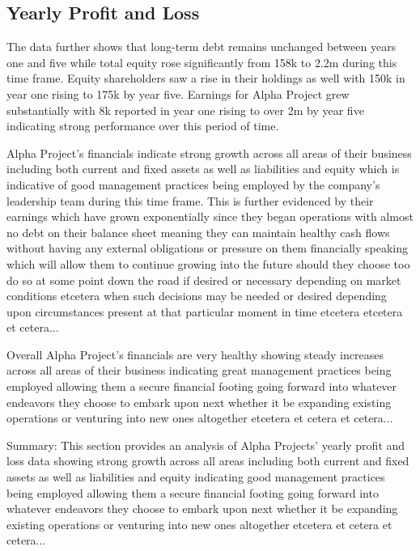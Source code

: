 

\subsection{Yearly Profit and Loss}\label{sec:title}

The data further shows that long-term debt remains unchanged between years one and five while total equity rose significantly from 158k to 2.2m during this time frame. Equity shareholders saw a rise in their holdings as well with 150k in year one rising to 175k by year five. Earnings for Alpha Project grew substantially with 8k reported in year one rising to over 2m by year five indicating strong performance over this period of time. 

Alpha Project's financials indicate strong growth across all areas of their business including both current and fixed assets as well as liabilities and equity which is indicative of good management practices being employed by the company's leadership team during this time frame. This is further evidenced by their earnings which have grown exponentially since they began operations with almost no debt on their balance sheet meaning they can maintain healthy cash flows without having any external obligations or pressure on them financially speaking which will allow them to continue growing into the future should they choose too do so at some point down the road if desired or necessary depending on market conditions etcetera when such decisions may be needed or desired depending upon circumstances present at that particular moment in time etcetera etcetera et cetera... 

Overall Alpha Project's financials are very healthy showing steady increases across all areas of their business indicating great management practices being employed allowing them a secure financial footing going forward into whatever endeavors they choose to embark upon next whether it be expanding existing operations or venturing into new ones altogether etcetera et cetera et cetera... 

Summary: This section provides an analysis of Alpha Projects' yearly profit and loss data showing strong growth across all areas including both current and fixed assets as well as liabilities and equity indicating good management practices being employed allowing them a secure financial footing going forward into whatever endeavors they choose to embark upon next whether it be expanding existing operations or venturing into new ones altogether etcetera et cetera et cetera...